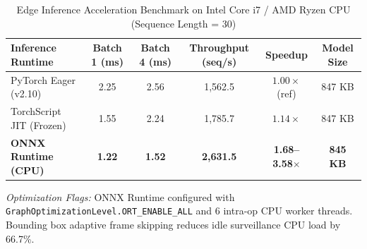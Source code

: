 \begin{table}[h]
\centering
\caption{Edge Inference Acceleration Benchmark on Intel Core i7 / AMD Ryzen CPU (Sequence Length = 30)}
\label{tab:edge_benchmarks}
\begin{tabular}{lccccc}
\toprule
\textbf{Inference Runtime} & \textbf{Batch 1 (ms)} & \textbf{Batch 4 (ms)} & \textbf{Throughput (seq/s)} & \textbf{Speedup} & \textbf{Model Size} \\
\midrule
PyTorch Eager (v2.10)       & 2.25 & 2.56 & 1,562.5 & $1.00\times$ (ref) & 847 KB \\
TorchScript JIT (Frozen)   & 1.55 & 2.24 & 1,785.7 & $1.14\times$       & 847 KB \\
\textbf{ONNX Runtime (CPU)} & \textbf{1.22} & \textbf{1.52} & \textbf{2,631.5} & \textbf{1.68--3.58$\times$} & \textbf{845 KB} \\
\bottomrule
\end{tabular}
\vspace{1ex}
{\raggedright \footnotesize \textit{Optimization Flags:} ONNX Runtime configured with \texttt{GraphOptimizationLevel.ORT\_ENABLE\_ALL} and 6 intra-op CPU worker threads. Bounding box adaptive frame skipping reduces idle surveillance CPU load by 66.7\%. \par}
\end{table}
